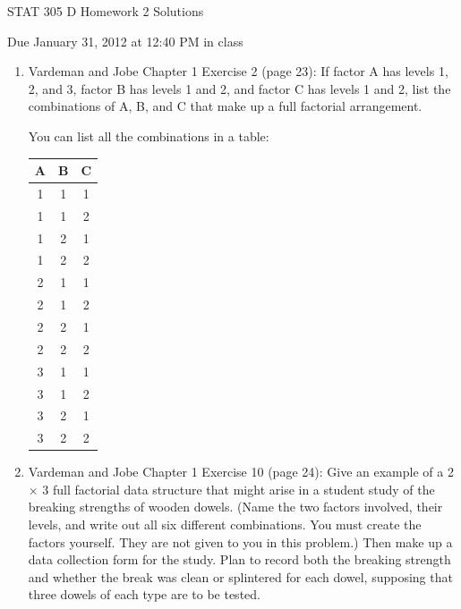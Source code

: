 \documentclass{article}\usepackage{graphicx, color}
\numberwithin{equation}{section}
\begin{document}
\begin{flushleft}


\begin{center} \LARGE
STAT 305 D Homework 2 Solutions
\end{center}
\begin{center} \Large
Due January 31, 2012 at 12:40 PM in class
\end{center}


\begin{enumerate}[1. ]
\item Vardeman and Jobe Chapter 1 Exercise 2 (page 23): If factor A has levels 1, 2, and 3, factor B has levels 1 and 2, and factor C has levels 1 and 2, list the combinations of A, B, and C that make up a full factorial arrangement.

\color{red}
You can list all the combinations in a table: 

\begin{center}
\begin{tabular}{ccc}
A & B & C \\ \hline
1 & 1 & 1 \\ 
1 & 1 & 2 \\ 
1 & 2 & 1 \\ 
1 & 2 & 2 \\ 
2 & 1 & 1 \\ 
2 & 1 & 2 \\ 
2 & 2 & 1 \\ 
2 & 2 & 2 \\ 
3 & 1 & 1 \\ 
3 & 1 & 2 \\ 
3 & 2 & 1 \\ 
3 & 2 & 2 \\ 
\end{tabular}
\end{center}

\color{black}


\item Vardeman and Jobe Chapter 1 Exercise 10 (page 24): Give an example of a 2 $\times$ 3 full factorial data structure that might arise in a student study of the breaking strengths of wooden dowels. (Name the two factors involved, their levels, and write out all six different combinations. You must create the factors yourself. They are not given to you in this problem.) Then make up a data collection form for the study. Plan to record both the breaking strength and whether the break was clean or splintered for each dowel, supposing that three dowels of each type are to be tested.



\end{enumerate}
\end{flushleft}
\end{document}
